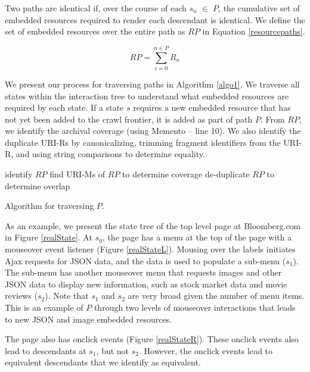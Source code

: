 \documentclass{sig-alternate}
\begin{document}
Two paths are identical if, over the course of each $s_n$ $\in$ $P$, the cumulative set of embedded resources required to render each descendant is identical. We define the set of embedded resources over the entire path as $RP$ in Equation \ref{resourcepaths}.

\begin{equation}
RP = \sum_{i=0}^{n \in P} R_n
\label{resourcepaths}
\end{equation}

We present our process for traversing paths in Algorithm \ref{algo1}. We traverse all states within the interaction tree to understand what embedded resources are required by each state. If a state $s$ requires a new embedded resource that has not yet been added to the crawl frontier, it is added as part of path $P$. From $RP$, we identify the archival coverage (using Memento -- line 10). We also identify the duplicate URI-Rs by canonicalizing, trimming fragment identifiers from the URI-R, and using string comparisons to determine equality.

\begin{algorithm}
identify $RP$\;
find URI-Ms of $RP$ to determine coverage\;
de-duplicate $RP$ to determine overlap\;

 \caption{Algorithm for traversing $P$.}
  \label{algo1}
\end{algorithm}



As an example, we present the state tree of the top level page at Bloomberg.com in Figure \ref{realState}. At $s_0$, the page has a menu at the top of the page with a mouseover event listener (Figure \ref{realStateL}). Mousing over the labels initiates Ajax requests for JSON data, and the data is used to populate a sub-menu ($s_1$). The sub-menu has another mouseover menu that requests images and other JSON data to display new information, such as stock market data and movie reviews ($s_2$). Note that $s_1$ and $s_2$ are very broad given the number of menu items. This is an example of $P$ through two levels of mouseover interactions that leads to new JSON and image embedded resources. 

The page also has onclick events (Figure \ref{realStateR}). These onclick events also lead to descendants at $s_1$, but not $s_2$. However, the onclick events lead to equivalent descendants that we identify as equivalent.
\end{document}
